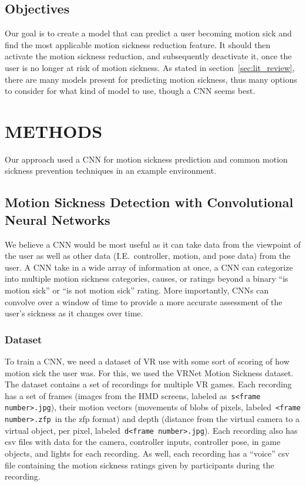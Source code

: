 \section{Objectives}
\label{sec:objectives}

Our goal is to create a model that can predict a user becoming motion sick and find the most applicable motion sickness reduction feature.
It should then activate the motion sickness reduction, and subsequently deactivate it, once the user is no longer at risk of motion sickness.
As stated in section~\ref{sec:lit_review}, there are many models present for predicting motion sickness, thus many options to consider for what kind of model to use, though a CNN seems best.

\chapter{METHODS}
\label{ch:methods}

Our approach used a CNN for motion sickness prediction and common motion sickness prevention techniques in an example environment.

\section{Motion Sickness Detection with Convolutional Neural Networks}
\label{sec:detection}

We believe a CNN would be most useful as it can take data from the viewpoint of the user as well as other data (I.E.\ controller, motion, and pose data) from the user.
A CNN take in a wide array of information at once, a CNN can categorize into multiple motion sickness categories, causes, or ratings beyond a binary ``is motion sick'' or ``is not motion sick'' rating.
More importantly, CNNs can convolve over a window of time to provide a more accurate assessment of the user's sickness as it changes over time.

\subsection{Dataset}
\label{subsec:dataset}

To train a CNN, we need a dataset of VR use with some sort of scoring of how motion sick the user was.
For this, we used the VRNet Motion Sickness dataset\cite{wen2023vr}.
The dataset contains a set of recordings for multiple VR games.
Each recording has a set of frames (images from the HMD screens, labeled as~\verb+s<frame number>.jpg+), their motion vectors (movements of blobs of pixels, labeled~\verb+<frame number>.zfp+~in the zfp format) and depth (distance from the virtual camera to a virtual object, per pixel, labeled~\verb+d<frame number>.jpg+).
Each recording also has csv files with data for the camera, controller inputs, controller pose, in game objects, and lights for each recording.
As well, each recording has a ``voice'' csv file containing the motion sickness ratings given by participants during the recording.

